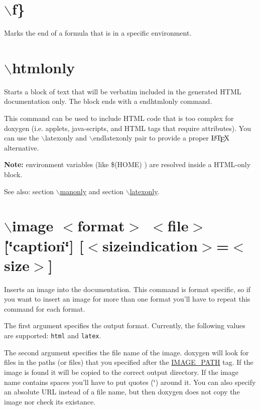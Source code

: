  \hypertarget{commands_cmdfcurlyclose}{}\section{$\backslash$f\}}\label{commands_cmdfcurlyclose}
Marks the end of a formula that is in a specific environment.



 \hypertarget{commands_cmdhtmlonly}{}\section{$\backslash$htmlonly}\label{commands_cmdhtmlonly}
 Starts a block of text that will be verbatim included in the generated HTML documentation only. The block ends with a endhtmlonly command.

This command can be used to include HTML code that is too complex for doxygen (i.e. applets, java-scripts, and HTML tags that require attributes). You can use the $\backslash$latexonly and $\backslash$endlatexonly pair to provide a proper $\mbox{\LaTeX}$ alternative.

{\bf Note:} environment variables (like \$(HOME) ) are resolved inside a HTML-only block.

\begin{Desc}
\item[See also:]section \hyperlink{commands_cmdmanonly}{$\backslash$manonly} and section \hyperlink{commands_cmdlatexonly}{$\backslash$latexonly}.\end{Desc}


 \hypertarget{commands_cmdimage}{}\section{$\backslash$image $<$format$>$ $<$file$>$ \mbox{[}\char`\"{}caption\char`\"{}\mbox{]} \mbox{[}$<$sizeindication$>$=$<$size$>$\mbox{]}}\label{commands_cmdimage}
 Inserts an image into the documentation. This command is format specific, so if you want to insert an image for more than one format you'll have to repeat this command for each format.

The first argument specifies the output format. Currently, the following values are supported: {\tt html} and {\tt latex}.

The second argument specifies the file name of the image. doxygen will look for files in the paths (or files) that you specified after the \hyperlink{config_cfg_image_path}{IMAGE\_\-PATH} tag. If the image is found it will be copied to the correct output directory. If the image name contains spaces you'll have to put quotes (\char`\"{}) around it. You can also specify an absolute URL instead of a file name, but then doxygen does not copy the image nor check its existance.

